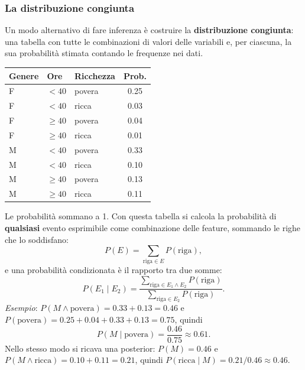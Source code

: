 \documentclass[12pt]{extarticle}
\begin{document}
\subsubsection{La distribuzione congiunta}

\noindent Un modo alternativo di fare inferenza è costruire la \textbf{distribuzione congiunta}: una tabella con tutte le combinazioni di valori delle variabili e, per ciascuna, la sua probabilità stimata contando le frequenze nei dati.

\begin{center}
\small
\begin{tabular}{lllc}
    \toprule
    \textbf{Genere} & \textbf{Ore} & \textbf{Ricchezza} & \textbf{Prob.} \\
    \midrule
    F & $< 40$   & povera & 0.25 \\
    F & $< 40$   & ricca  & 0.03 \\
    F & $\ge 40$ & povera & 0.04 \\
    F & $\ge 40$ & ricca  & 0.01 \\
    M & $< 40$   & povera & 0.33 \\
    M & $< 40$   & ricca  & 0.10 \\
    M & $\ge 40$ & povera & 0.13 \\
    M & $\ge 40$ & ricca  & 0.11 \\
    \bottomrule
\end{tabular}
\end{center}

\noindent Le probabilità sommano a 1. Con questa tabella si calcola la probabilità di \textbf{qualsiasi} evento esprimibile come combinazione delle feature, sommando le righe che lo soddisfano:
\[
P(E) = \sum_{\text{riga} \in E} P(\text{riga}),
\]
e una probabilità condizionata è il rapporto tra due somme:
\[
P(E_1 \mid E_2) = \frac{\sum_{\text{riga} \in E_1 \land E_2} P(\text{riga})}{\sum_{\text{riga} \in E_2} P(\text{riga})}.
\]
\textit{Esempio}: $P(M \land \text{povera}) = 0.33+0.13 = 0.46$ e $P(\text{povera}) = 0.25+0.04+0.33+0.13 = 0.75$, quindi
\[
P(M \mid \text{povera}) = \frac{0.46}{0.75} \approx 0.61.
\]
Nello stesso modo si ricava una posterior: $P(M)=0.46$ e $P(M \land \text{ricca}) = 0.10+0.11=0.21$, quindi $P(\text{ricca} \mid M) = 0.21/0.46 \approx 0.46$.
\end{document}
